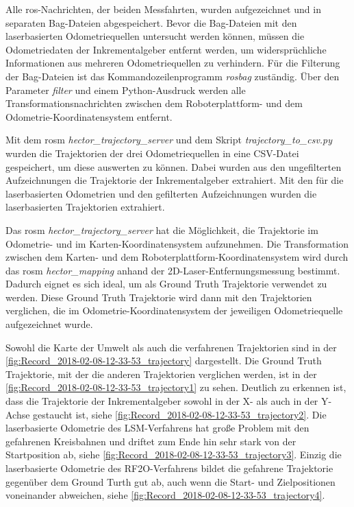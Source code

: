 Alle \gls{ros}-Nachrichten, der beiden Messfahrten, wurden aufgezeichnet und in separaten Bag-Dateien abgespeichert. Bevor die Bag-Dateien mit den laserbasierten Odometriequellen untersucht werden können, müssen die Odometriedaten der Inkrementalgeber entfernt werden, um widersprüchliche Informationen aus mehreren Odometriequellen zu verhindern. Für die Filterung der Bag-Dateien ist das Kommandozeilenprogramm \textit{rosbag} zuständig. Über den Parameter \textit{filter} und einem Python-Ausdruck werden alle Transformationsnachrichten zwischen dem Roboterplattform- und dem Odometrie-Koordinatensystem entfernt.

Mit dem \gls{rosm} \textit{hector\_trajectory\_server} und dem Skript \textit{trajectory\_to\_csv.py} wurden die Trajektorien der drei Odometriequellen in eine CSV-Datei gespeichert, um diese auswerten zu können. Dabei wurden aus den ungefilterten Aufzeichnungen die Trajektorie der Inkrementalgeber extrahiert. Mit den  für die laserbasierten Odometrien und den gefilterten Aufzeichnungen wurden die laserbasierten Trajektorien extrahiert.

Das \gls{rosm} \textit{hector\_trajectory\_server} hat die Möglichkeit, die Trajektorie im Odometrie- und im Karten-Koordinatensystem aufzunehmen. Die Transformation zwischen dem Karten- und dem Roboterplattform-Koordinatensystem wird durch das \gls{rosm} \textit{hector\_mapping} anhand der 2D-Laser-Entfernungsmessung bestimmt. Dadurch eignet es sich ideal, um als Ground Truth Trajektorie verwendet zu werden. Diese Ground Truth Trajektorie wird dann mit den Trajektorien verglichen, die im Odometrie-Koordinatensystem der jeweiligen Odometriequelle aufgezeichnet wurde.


Sowohl die Karte der Umwelt als auch die verfahrenen Trajektorien sind in der \autoref{fig:Record_2018-02-08-12-33-53_trajectory} dargestellt. Die Ground Truth Trajektorie, mit der die anderen Trajektorien verglichen werden, ist in der \autoref{fig:Record_2018-02-08-12-33-53_trajectory1} zu sehen. Deutlich zu erkennen ist, dass die Trajektorie der Inkrementalgeber sowohl in der X- als auch in der Y-Achse gestaucht ist, siehe \autoref{fig:Record_2018-02-08-12-33-53_trajectory2}. Die laserbasierte Odometrie des LSM-Verfahrens hat große Problem mit den gefahrenen Kreisbahnen und driftet zum Ende hin sehr stark von der Startposition ab, siehe \autoref{fig:Record_2018-02-08-12-33-53_trajectory3}. Einzig die laserbasierte Odometrie des RF2O-Verfahrens bildet die gefahrene Trajektorie gegenüber dem Ground Turth gut ab, auch wenn die Start- und Zielpositionen voneinander abweichen, siehe \autoref{fig:Record_2018-02-08-12-33-53_trajectory4}.

